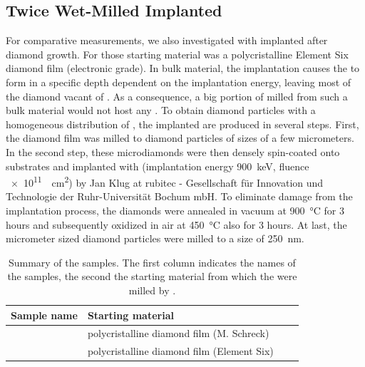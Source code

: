 	\subsection{Twice Wet-Milled Implanted \Nds}\label{subsec::2_milled_nds}
	For comparative measurements, we also investigated \nds with \sivs implanted after diamond growth. 
	For those \nds starting material was a polycristalline Element Six diamond film (electronic grade).
	In bulk material, the implantation causes the \sivs to form in a specific depth dependent on the implantation energy, leaving most of the diamond vacant of \sivs.
	As a consequence, a big portion of  \nds milled from such a bulk material would not host any \sivs.
	To obtain diamond particles with a homogeneous distribution of \sivs, the implanted \nds are produced in several steps. 
	First, the diamond film was milled to diamond particles of sizes of a few micrometers.
	In the second step, these microdiamonds were then densely spin-coated onto \ir substrates and implanted with (implantation energy \SI{900}{keV}, fluence \SI{e11}{\per\centi\meter\squared}) by Jan Klug at rubitec - Gesellschaft für Innovation und Technologie der Ruhr-Universität Bochum mbH.
	To eliminate damage from the implantation process, the diamonds were annealed in vacuum at \SI{900}{\degreeCelsius} for 3 hours and subsequently oxidized in air at \SI{450}{\degreeCelsius} also for 3 hours.
	At last, the micrometer sized diamond particles were milled to a size of \SI{250}{\nano\meter}.



	\begin{table}[tp] 
		\centering 
		\caption{Summary of the \BASD samples. The first column indicates the names of the samples, the second the starting material from which the \nds were milled by \basd.} \label{tab::samplenames} 
			\begin{tabular}{llll} 
			\toprule
			Sample name & Starting material \\ 
			\midrule
			\basds & polycristalline diamond film (M. Schreck) \\ \hline 
			\basdes & polycristalline diamond film (Element Six) \\ 
			\bottomrule
			\end{tabular} 
	\end{table}



